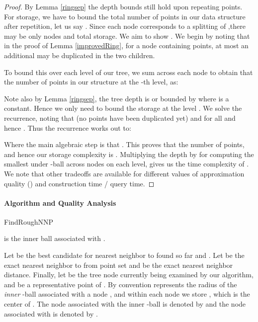 \documentclass[11pt]{myclass}
\begin{document}
\begin{proof}
By Lemma \ref{ringsep} the depth bounds still hold upon repeating points.  For storage, we have to bound
the total number of points in our data structure after repetition, let us say . 
Since each node corresponds to a splitting of ,there may be only  nodes and total storage. We aim to show . We begin by noting that in the proof of Lemma \ref{improvedRing}, for a node containing  points, at most an additional  may be duplicated in the two children.

To bound this over each level of our tree, we sum across each node to obtain that the number of points  in our structure at the -th level, as: 
 
Note also by Lemma \ref{ringsep}, the tree depth is  
or bounded by  where  is a constant. Hence we only need to bound the storage at the level . We solve the recurrence, noting that  (no points have been duplicated yet) and  for all  and hence 
. Thus the recurrence works out to:


Where the main algebraic step is that . 
This proves that the number of points, and hence our storage complexity is . Multiplying the depth by  for computing the smallest under -ball across nodes on each level, gives us the time complexity of .
We note that other tradeoffs are available for different values of approximation quality () and construction time / query time.
\end{proof}



\paragraph{Algorithm and Quality Analysis}
\begin{algorithm}
  \caption{FindRoughNNP}
  \begin{algorithmic}
  	\STATE 
  	\STATE 
    \STATE 
	
	\STATE 
	\STATE  is the inner ball associated with .
	\IF {}
		\STATE 
		\STATE 
	\ENDIF
	\IF {}
		\STATE 
	\ELSE
		\STATE 
	\ENDIF
	\ENDWHILE
	\RETURN 
  \end{algorithmic}
  \label{roughNN}
\end{algorithm}


Let  be the best candidate for nearest neighbor to  
found so far and . Let  
be the exact nearest neighbor to  from point set  and  
be the exact nearest neighbor distance. Finally, let  be the tree node currently
 being examined by our algorithm, and  be a representative 
point  of . By convention  represents the radius of the \emph{inner} -ball associated with a node ,
 and within each node  we store , which 
is the center of . The node associated with the inner -ball  
is denoted by  and the node associated with  is denoted by 
. 
\end{document}
